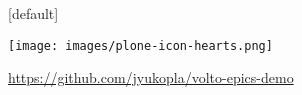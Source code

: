 \documentclass[12pt,aspectratio=169]{beamer}
\begin{document}

[default]
\begin{frame}[standout]
\vfill
\texttt{[image: images/plone-icon-hearts.png]}
\par
\href{https://github.com/jyukopla/volto-epics-demo}{https://github.com/jyukopla/volto-epics-demo}
\end{frame}

\end{document}
